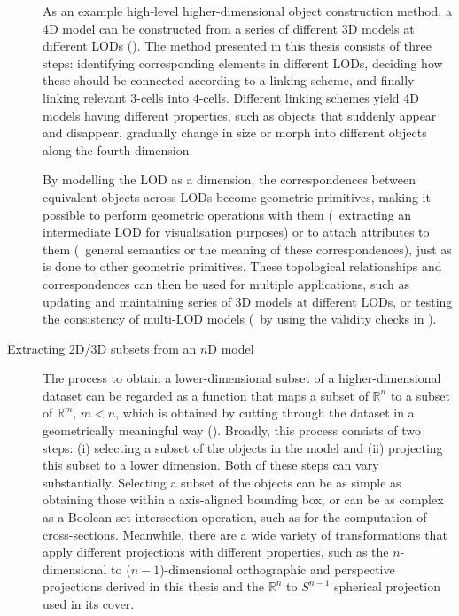 \begin{description}
As an example high-level higher-dimensional object construction method, a 4D model can be constructed from a series of different 3D models at different LODs ().
The method presented in this thesis consists of three steps: identifying corresponding elements in different LODs, deciding how these should be connected according to a linking scheme, and finally linking relevant 3-cells into 4-cells.
Different linking schemes yield 4D models having different properties, such as objects that suddenly appear and disappear, gradually change in size or morph into different objects along the fourth dimension.

By modelling the LOD as a dimension, the correspondences between equivalent objects across LODs become geometric primitives, making it possible to perform geometric operations with them (\eg\ extracting an intermediate LOD for visualisation purposes) or to attach attributes to them (\eg\ general semantics or the meaning of these correspondences), just as is done to other geometric primitives.
These topological relationships and correspondences can then be used for multiple applications, such as updating and maintaining series of 3D models at different LODs, or testing the consistency of multi-LOD models (\eg\ by using the validity checks in \citet{Groger11}).


\item[Extracting 2D/3D subsets from an $n$D model]

The process to obtain a lower-dimensional subset of a higher-dimensional dataset can be regarded as a function that maps a subset of $\mathbb{R}^n$ to a subset of $\mathbb{R}^m$, $m < n$, which is obtained by cutting through the dataset in a geometrically meaningful way ().
Broadly, this process consists of two steps: (i) selecting a subset of the objects in the model and (ii) projecting this subset to a lower dimension.
Both of these steps can vary substantially.
Selecting a subset of the objects can be as simple as obtaining those within a axis-aligned bounding box, or can be as complex as a Boolean set intersection operation, such as for the computation of cross-sections.
Meanwhile, there are a wide variety of transformations that apply different projections with different properties, such as the $n$-dimensional to ($n-1$)-dimensional orthographic and perspective projections derived in this thesis and the $\mathbb{R}^n$ to $S^{n-1}$ spherical projection used in its cover.


\end{description}
